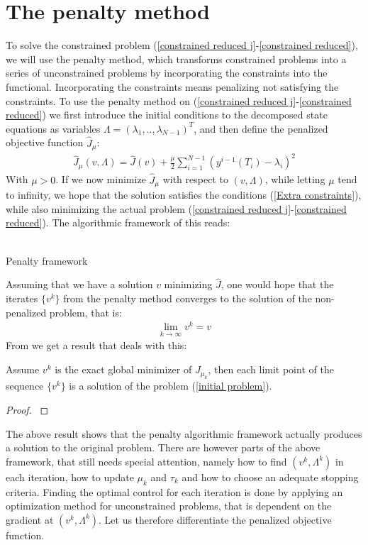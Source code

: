 \section{The penalty method} \label{penalty_sec}
To solve the constrained problem (\ref{constrained reduced j}-\ref{constrained reduced}), we will use the penalty method\cite{nocedal2006numerical}, which transforms constrained problems into a series of unconstrained problems by incorporating the constraints into the functional. Incorporating the constraints means penalizing not satisfying the constraints. To use the penalty method on (\ref{constrained reduced j}-\ref{constrained reduced}) we first introduce the initial conditions to the decomposed state equations as variables $\Lambda = (\lambda_1,..,\lambda_{N-1})^T$, and then define the penalized objective function $\hat J_{\mu}$:
\begin{align}
\hat J_{\mu}(v,\Lambda) = \hat J(v) + \frac{\mu}{2}\sum_{i=1}^{N-1}(y^{i-1}(T_i)-\lambda_i)^2 \label{pen_obj_J}
\end{align}
With $\mu>0$. If we now minimize $\hat{J}_{\mu}$ with respect to $(v,\Lambda)$, while letting $\mu$ tend to infinity, we hope that the solution satisfies the conditions (\ref{Extra constraints}), while also minimizing the actual problem (\ref{constrained reduced j}-\ref{constrained reduced}). The algorithmic framework of this reads:
\\
\\
\begin{algorithm}[H]
\caption{Penalty framework\label{PEN_ALG}}
\end{algorithm}
\noindent
Assuming that we have a solution $v$ minimizing $\hat J$, one would hope that the iterates $\{v^k\}$ from the penalty method converges to the solution of the non-penalized problem, that is:
\begin{align*}
\lim_{k\rightarrow \infty} v^k =v
\end{align*}
From \cite{nocedal2006numerical} we get a result that deals with this:
\begin{theorem}
Assume $v^k$ is the exact global minimizer of $J_{\mu_k}$, then each limit point of the sequence $\{v^k\}$ is a solution of the problem (\ref{initial problem}).
\end{theorem}
\begin{proof}
\cite{nocedal2006numerical}
\end{proof}
\noindent
The above result shows that the penalty algorithmic framework actually produces a solution to the original problem. There are however parts of the above framework, that still needs special attention, namely how to find $(v^k,\Lambda^k)$ in each iteration, how to update $\mu_k$ and $\tau_k$ and how to choose an adequate stopping criteria. Finding the optimal control for each iteration is done by applying an optimization method for unconstrained problems, that is dependent on the gradient at $(v^k,\Lambda^k)$. Let us therefore differentiate the penalized objective function.
